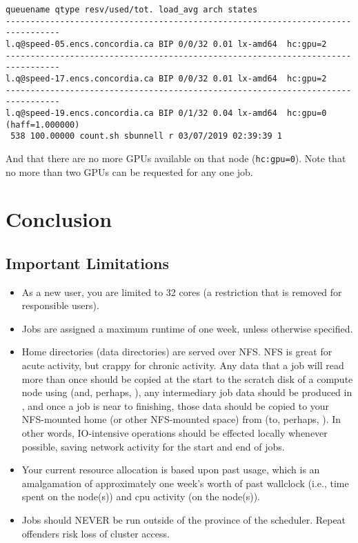 \documentclass{easychair}
\begin{document}
\small
\begin{verbatim}
queuename qtype resv/used/tot. load_avg arch states 
--------------------------------------------------------------------------------- 
l.q@speed-05.encs.concordia.ca BIP 0/0/32 0.01 lx-amd64  hc:gpu=2 
--------------------------------------------------------------------------------- 
l.q@speed-17.encs.concordia.ca BIP 0/0/32 0.01 lx-amd64  hc:gpu=2 
--------------------------------------------------------------------------------- 
l.q@speed-19.encs.concordia.ca BIP 0/1/32 0.04 lx-amd64  hc:gpu=0 (haff=1.000000) 
 538 100.00000 count.sh sbunnell r 03/07/2019 02:39:39 1
\end{verbatim}
\normalsize

And that there are no more GPUs available on that node (\texttt{hc:gpu=0}). Note that no 
more than two GPUs can be requested for any one job. 

\section{Conclusion}
\label{sect:conclusion}

\subsection{Important Limitations}
\label{sect:limitations}

\begin{itemize}
\item
As a new user, you are limited to 32 cores (a restriction that is removed for responsible users).

\item
Jobs are assigned a maximum runtime of one week, unless otherwise specified. 

\item
Home directories (data directories) are served over NFS. NFS is great for acute activity, but crappy for chronic activity. Any data that a job will read more than once should be copied at the start to the scratch disk of a compute node using  (and, perhaps, ), any intermediary job data should be produced in , and once a job is near to finishing, those data should be copied to your NFS-mounted home (or other NFS-mounted space) from  (to, perhaps, ). In other words, IO-intensive operations should be effected locally whenever possible, saving network activity for the start and end of jobs. 

\item
Your current resource allocation is based upon past usage, which is an amalgamation of approximately one week's worth of past wallclock (i.e., time spent on the node(s)) and cpu activity (on the node(s)).

\item
Jobs should NEVER be run outside of the province of the scheduler. Repeat offenders risk loss of cluster access. 
\end{itemize}
\end{document}
